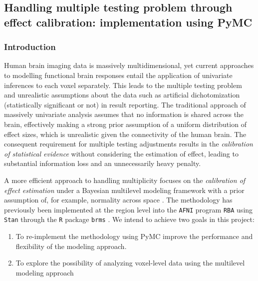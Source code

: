 \documentclass[../main.tex]{subfiles}
\begin{document}
\subsection{Handling multiple testing problem through effect calibration: implementation using PyMC}

%

\subsubsection{Introduction}

Human brain imaging data is massively multidimensional, yet current approaches to modelling functional brain responses entail the application of univariate inferences to each voxel separately. This leads to the multiple testing problem and unrealistic assumptions about the data such as artificial dichotomization (statistically significant or not) in result reporting. The traditional approach of massively univariate analysis assumes that no information is shared across the brain, effectively making a strong prior assumption of a uniform distribution of effect sizes, which is unrealistic given the connectivity of the human brain. The consequent requirement for multiple testing adjustments results in the \textit{calibration of statistical evidence} without considering the estimation of effect, leading to substantial information loss and an unnecessarily heavy penalty.

A more efficient approach to handling multiplicity focuses on the \textit{calibration of effect estimation} under a Bayesian multilevel modeling framework with a prior assumption of, for example, normality across space \parencite{chenHandlingMultiplicityNeuroimaging2019}. The methodology has previously been implemented at the region level into the \texttt{AFNI} program \texttt{RBA} \parencite{chen_sources_2022} using \texttt{Stan} through the \texttt{R} package \texttt{brms} \parencite{burknerBrmsPackageBayesian2017}. We intend to achieve two goals in this project: 
\begin{enumerate}[label=(\roman*),nolistsep]
    \item To re-implement the methodology using PyMC improve the performance and flexibility of the modeling approach.
    \item To explore the possibility of analyzing voxel-level data using the multilevel modeling approach
\end{enumerate}
\end{document}
